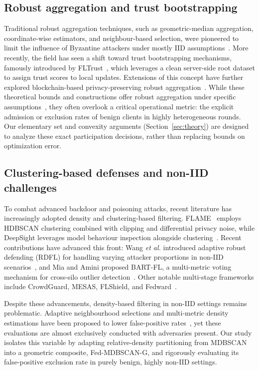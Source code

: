\documentclass[journal]{IEEEtran}
\begin{document}
\subsection{Robust aggregation and trust bootstrapping}
Traditional robust aggregation techniques, such as geometric-median aggregation, coordinate-wise estimators, and neighbour-based selection, were pioneered to limit the influence of Byzantine attackers under mostly IID assumptions~\cite{blanchard2017,yin2018,pillutla2022rfa}. More recently, the field has seen a shift toward trust bootstrapping mechanisms, famously introduced by FLTrust~\cite{cao2021fltrust}, which leverages a clean server-side root dataset to assign trust scores to local updates. Extensions of this concept have further explored blockchain-based privacy-preserving robust aggregation~\cite{miao2022privacy}. While these theoretical bounds and constructions offer robust aggregation under specific assumptions~\cite{karimireddy2022bucketing,allouah2023mixing}, they often overlook a critical operational metric: the explicit admission or exclusion rates of benign clients in highly heterogeneous rounds. Our elementary set and convexity arguments (Section~\ref{sec:theory}) are designed to analyze these exact participation decisions, rather than replacing bounds on optimization error.

\subsection{Clustering-based defenses and non-IID challenges}
To combat advanced backdoor and poisoning attacks, recent literature has increasingly adopted density and clustering-based filtering. FLAME~\cite{nguyen2022flame} employs HDBSCAN clustering combined with clipping and differential privacy noise, while DeepSight leverages model behaviour inspection alongside clustering~\cite{rieger2022deepsight}. Recent contributions have advanced this front: Wang \emph{et al.} introduced adaptive robust defending (RDFL) for handling varying attacker proportions in non-IID scenarios~\cite{wang2023adaptive}, and Mia and Amini proposed BART-FL, a multi-metric voting mechanism for cross-silo outlier detection~\cite{mia2025bart}. Other notable multi-stage frameworks include CrowdGuard, MESAS, FLShield, and Fedward~\cite{rieger2024crowdguard,krauss2023mesas,kabir2023flshield,chen2023fedward}.

Despite these advancements, density-based filtering in non-IID settings remains problematic. Adaptive neighbourhood selections and multi-metric density estimations have been proposed to lower false-positive rates~\cite{ramana2026alldd}, yet these evaluations are almost exclusively conducted with adversaries present. Our study isolates this variable by adapting relative-density partitioning from MDBSCAN~\cite{qian2024mdbscan} into a geometric composite, Fed-MDBSCAN-G, and rigorously evaluating its false-positive exclusion rate in purely benign, highly non-IID settings.
\end{document}
